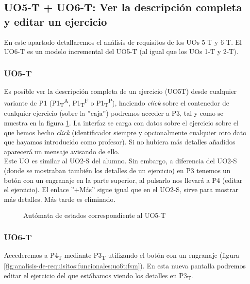 \subsection{UO5-T + UO6-T: Ver la descripción completa y editar un ejercicio}
\label{analisis-de-requisitos:funcionales:uo5t}

En este apartado detallaremos el análisis de requisitos de los UOs 5-T y 6-T. El UO6-T es un modelo incremental del UO5-T (al igual que los UOs 1-T y 2-T).\\

\subsubsection{UO5-T}

Es posible ver la descripción completa de un ejercicio (UO5T) desde cualquier variante de P1 (P1\textsubscript{T}\textsuperscript{A}, P1\textsubscript{T}\textsuperscript{F} o P1\textsubscript{T}\textsuperscript{P}), haciendo \textit{click} sobre el contenedor de cualquier ejercicio (sobre la ''caja'') podremos acceder a P3, tal y como se muestra en la figura \ref{fig:analisis-de-requisitos:funcionales:uo5t:fsm}. La interfaz se carga con datos sobre el ejercicio sobre el que hemos hecho \textit{click} (identificador siempre y opcionalmente cualquier otro dato que hayamos introducido como profesor). Si no hubiera más detalles añadidos aparecerá un mensaje avisando de ello.\\

Este UO es similar al UO2-S del alumno. Sin embargo, a diferencia del UO2-S (donde se mostraban también los detalles de un ejercicio) en P3 tenemos un botón con un engranaje en la parte superior, al pulsarlo nos llevará a P4 (editar el ejercicio). El enlace ''+Más'' sigue igual que en el UO2-S, sirve para mostrar más detalles. Más tarde es eliminado.\\

\noindent
\begin{figure}[!htbp]
\noindent
{}
\caption{Autómata de estados correspondiente al UO5-T}
\label{fig:analisis-de-requisitos:funcionales:uo5t:fsm}
\end{figure}

\subsubsection{UO6-T}

Accederemos a P4\textsubscript{T} mediante P3\textsubscript{T} utilizando el botón con un engranaje (figura \ref{fig:analisis-de-requisitos:funcionales:uo6t:fsm}). En esta nueva pantalla podremos editar el ejercicio del que estábamos viendo los detalles en P3\textsubscript{T}.\\

